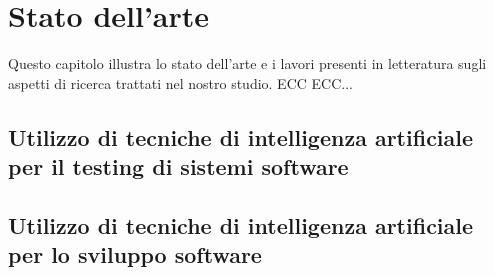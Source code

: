 \chapter{Stato dell'arte} %
%

\begin{citazione}
Questo capitolo illustra lo stato dell'arte e i lavori presenti in letteratura sugli aspetti di ricerca trattati nel nostro studio. ECC ECC...
\end{citazione}

\section{Utilizzo di tecniche di intelligenza artificiale per il testing di sistemi software}

\section{ Utilizzo di tecniche di intelligenza artificiale per lo sviluppo software}

\newpage